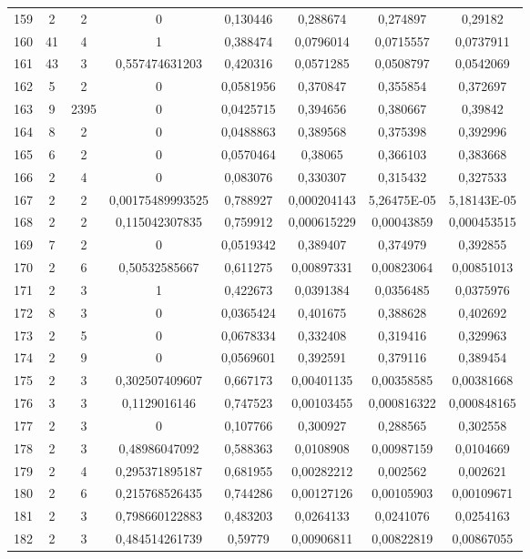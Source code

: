 \begin{longtable}{|c|c|c|c|c|c|c|c|}
159 & 2 & 2 & 0 & 0,130446 & 0,288674 & 0,274897 & 0,29182  \\
160 & 41 & 4 & 1 & 0,388474 & 0,0796014 & 0,0715557 & 0,0737911  \\
161 & 43 & 3 & 0,557474631203 & 0,420316 & 0,0571285 & 0,0508797 & 0,0542069  \\
162 & 5 & 2 & 0 & 0,0581956 & 0,370847 & 0,355854 & 0,372697  \\
163 & 9 & 2395 & 0 & 0,0425715 & 0,394656 & 0,380667 & 0,39842  \\
164 & 8 & 2 & 0 & 0,0488863 & 0,389568 & 0,375398 & 0,392996  \\
165 & 6 & 2 & 0 & 0,0570464 & 0,38065 & 0,366103 & 0,383668  \\
166 & 2 & 4 & 0 & 0,083076 & 0,330307 & 0,315432 & 0,327533  \\
167 & 2 & 2 & 0,00175489993525 & 0,788927 & 0,000204143 & 5,26475E-05 & 5,18143E-05  \\
168 & 2 & 2 & 0,115042307835 & 0,759912 & 0,000615229 & 0,00043859 & 0,000453515  \\
169 & 7 & 2 & 0 & 0,0519342 & 0,389407 & 0,374979 & 0,392855  \\
170 & 2 & 6 & 0,50532585667 & 0,611275 & 0,00897331 & 0,00823064 & 0,00851013  \\
171 & 2 & 3 & 1 & 0,422673 & 0,0391384 & 0,0356485 & 0,0375976  \\
172 & 8 & 3 & 0 & 0,0365424 & 0,401675 & 0,388628 & 0,402692  \\
173 & 2 & 5 & 0 & 0,0678334 & 0,332408 & 0,319416 & 0,329963  \\
174 & 2 & 9 & 0 & 0,0569601 & 0,392591 & 0,379116 & 0,389454  \\
175 & 2 & 3 & 0,302507409607 & 0,667173 & 0,00401135 & 0,00358585 & 0,00381668  \\
176 & 3 & 3 & 0,1129016146 & 0,747523 & 0,00103455 & 0,000816322 & 0,000848165  \\
177 & 2 & 3 & 0 & 0,107766 & 0,300927 & 0,288565 & 0,302558  \\
178 & 2 & 3 & 0,48986047092 & 0,588363 & 0,0108908 & 0,00987159 & 0,0104669  \\
179 & 2 & 4 & 0,295371895187 & 0,681955 & 0,00282212 & 0,002562 & 0,002621  \\
180 & 2 & 6 & 0,215768526435 & 0,744286 & 0,00127126 & 0,00105903 & 0,00109671  \\
181 & 2 & 3 & 0,798660122883 & 0,483203 & 0,0264133 & 0,0241076 & 0,0254163  \\
182 & 2 & 3 & 0,484514261739 & 0,59779 & 0,00906811 & 0,00822819 & 0,00867055  \\

\end{longtable}
